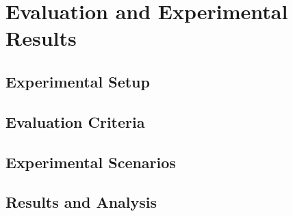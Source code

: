 \chapter[Chapter 4]{Evaluation and Experimental Results}
\label{chap:evaluation_experimental_results}

\section{Experimental Setup}
\label{sec:experimental_setup}

\section{Evaluation Criteria}
\label{sec:evaluation_criteria}

\section{Experimental Scenarios}
\label{sec:experimental_scenarios}

\section{Results and Analysis}
\label{sec:results_analysis}